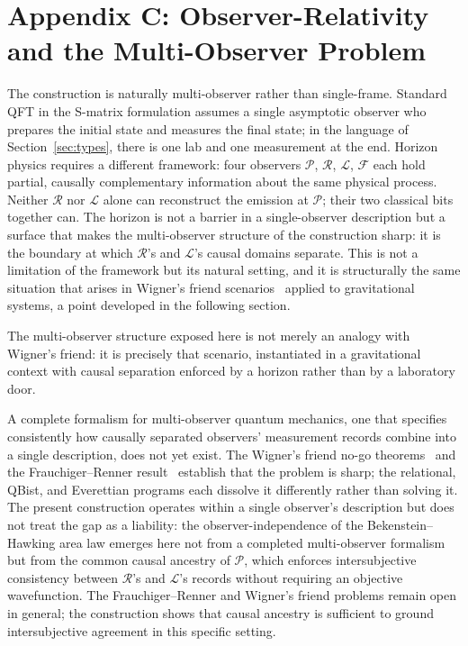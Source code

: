 \section{Appendix C: Observer-Relativity and the Multi-Observer Problem}
The construction is naturally multi-observer rather than 
single-frame. Standard QFT in the S-matrix formulation 
assumes a single asymptotic observer who prepares the 
initial state and measures the final state; in the 
language of Section~\ref{sec:types}, there is one lab 
and one measurement at the end. Horizon physics 
requires a different framework: four observers 
$\mathcal{P}$, $\mathcal{R}$, $\mathcal{L}$, 
$\mathcal{F}$ each hold partial, causally 
complementary information about the same physical 
process. Neither $\mathcal{R}$ nor $\mathcal{L}$ alone 
can reconstruct the emission at $\mathcal{P}$; their 
two classical bits together can. The horizon is not 
a barrier in a single-observer description but a 
surface that makes the multi-observer structure of 
the construction sharp: it is the boundary at which 
$\mathcal{R}$'s and $\mathcal{L}$'s causal domains 
separate. This is not a limitation of the framework 
but its natural setting, and it is structurally the 
same situation that arises in Wigner's friend 
scenarios~\cite{brukner2018no} applied to 
gravitational systems, a point developed in the following section.

The multi-observer structure exposed here is not 
merely an analogy with Wigner's friend: it is 
precisely that scenario, instantiated in a 
gravitational context with causal separation enforced 
by a horizon rather than by a laboratory door.

A complete formalism for multi-observer quantum 
mechanics, one that specifies consistently how 
causally separated observers' measurement records 
combine into a single description, does not yet 
exist. The Wigner's friend no-go 
theorems~\cite{brukner2018no} and the 
Frauchiger--Renner result~\cite{frauchiger2018quantum} 
establish that the problem is sharp; the relational, 
QBist, and Everettian programs each dissolve it 
differently rather than solving it. The present 
construction operates within a single observer's 
description but does not treat the gap as a 
liability: the observer-independence of the 
Bekenstein--Hawking area law emerges here not from 
a completed multi-observer formalism but from the 
common causal ancestry of $\mathcal{P}$, which 
enforces intersubjective consistency between 
$\mathcal{R}$'s and $\mathcal{L}$'s records without 
requiring an objective wavefunction. The 
Frauchiger--Renner and Wigner's friend problems 
remain open in general; the construction shows that 
causal ancestry is sufficient to ground 
intersubjective agreement in this specific setting.

